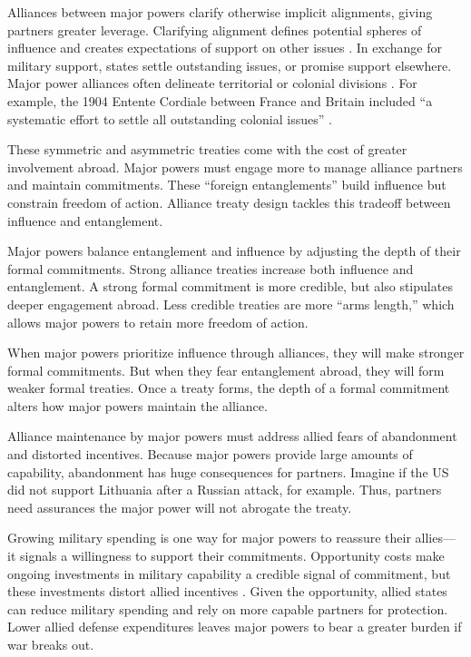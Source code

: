 \documentclass[12pt]{article}
\begin{document}
Alliances between major powers clarify otherwise implicit alignments, giving partners greater leverage. 
Clarifying alignment defines potential spheres of influence and creates expectations of support on other issues \citep{Snyder1997}. 
In exchange for military support, states settle outstanding issues, or promise support elsewhere. 
Major power alliances often delineate territorial or colonial divisions \cite{Langer1950, Kissinger1994}.
For example, the 1904 Entente Cordiale between France and Britain included ``a systematic effort to settle all outstanding colonial issues'' \citep[pg. 189]{Kissinger1994}.   


These symmetric and asymmetric treaties come with the cost of greater involvement abroad.
Major powers must engage more to manage alliance partners and maintain commitments.
These ``foreign entanglements'' build influence but constrain freedom of action.
Alliance treaty design tackles this tradeoff between influence and entanglement. 


Major powers balance entanglement and influence by adjusting the depth of their formal commitments. 
Strong alliance treaties increase both influence and entanglement. 
A strong formal commitment is more credible, but also stipulates deeper engagement abroad. 
Less credible treaties are more ``arms length,'' which allows major powers to retain more freedom of action. 


When major powers prioritize influence through alliances, they will make stronger formal commitments.
But when they fear entanglement abroad, they will form weaker formal treaties. 
Once a treaty forms, the depth of a formal commitment alters how major powers maintain the alliance. 


Alliance maintenance by major powers must address allied fears of abandonment and distorted incentives. 
Because major powers provide large amounts of capability, abandonment has huge consequences for partners. 
Imagine if the US did not support Lithuania after a Russian attack, for example. 
Thus, partners need assurances the major power will not abrogate the treaty. 


Growing military spending is one way for major powers to reassure their allies--- it signals a willingness to support their commitments. 
Opportunity costs make ongoing investments in military capability a credible signal of commitment, but these investments distort allied incentives \citep{Lake1996, Lake2009}. 
Given the opportunity, allied states can reduce military spending and rely on more capable partners for protection.
Lower allied defense expenditures leaves major powers to bear a greater burden if war breaks out. 
\end{document}
